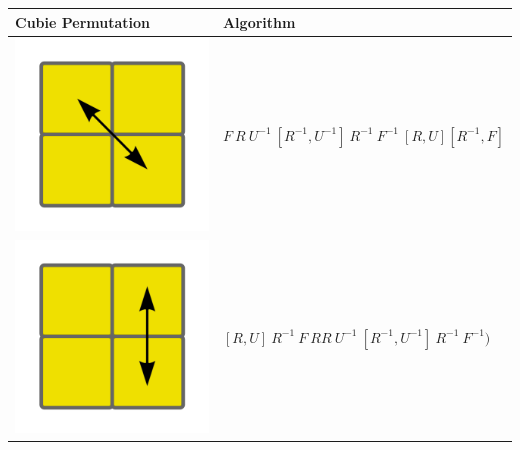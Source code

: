 \documentclass[12pt,a4paper]{article}
\theoremstyle{custom}
\begin{document}
\begin{center}
\begin{tabular}{m{4cm} m{8cm}}
\toprule
Cubie Permutation & Algorithm \\
\midrule
\includegraphics[scale=0.1]{corners1.png} & $F \ R \ U^{-1} \ [R^{-1}, U^{-1}] \ R^{-1} \ F^ {-1} \ [R, U] [R^{-1}, F]$ \\
\includegraphics[scale=0.1]{corners2.png} & $[R,U] \ R^{-1} \ F \ RR \ U^{-1} \ [R^{-1}, U^{- 1}] \ R^{-1} \ F^{-1})$ \\

\end{tabular}
\end{center}
\end{document}
